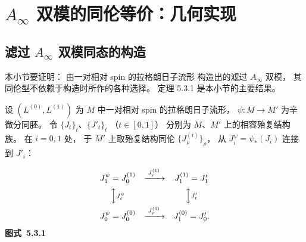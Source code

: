 
\section{$A_\infty$ 双模的同伦等价：几何实现}
\label{sec:5-3}

\subsection{滤过 $A_\infty$ 双模同态的构造}
\label{subsec:5-3-1}

本小节要证明：
由一对相对 spin 的拉格朗日子流形
构造出的滤过 $A_\infty$ 双模，
其同伦型不依赖于构造时所作的各种选择。
定理 5.3.1 是本小节的主要结果。

设 $(L^{(0)},L^{(1)})$ 为
$M$ 中一对相对 spin 的拉格朗日子流形，
$\psi\colon M\to M'$ 为辛微分同胚。
令 $\{J_t\}_t$、$\{J'_t\}_t$
（$t\in[0,1]$）
分别为 $M$、$M'$ 上的相容殆复结构族。
在 $i=0,1$ 处，
于 $M'$ 上取殆复结构同伦
$\{J^{(i)}_\rho\}_\rho$，
从 $J_i^\psi=\psi_*(J_i)$ 连接到 $J'_i$：
\begin{center}
\[
\begin{array}{ccc}
J^\psi_1=J^{(1)}_0
 &\xrightarrow{\;J^{(1)}_\rho\;}&
J^{(1)}_1=J'_1\\[2mm]
\Big\updownarrow\vcenter{\hbox{\scriptsize$J^\psi_t$}}
 &&\Big\updownarrow\vcenter{\hbox{\scriptsize$J'_t$}}\\[2mm]
J^\psi_0=J^{(0)}_0
 &\xrightarrow{\;J^{(0)}_\rho\;}&
J^{(0)}_1=J'_0 .
\end{array}
\]
\renewcommand{\thefigure}{5.3.1}
{\normalfont\bfseries 图式~\thefigure}\label{diag:5-3-1}
\end{center}

